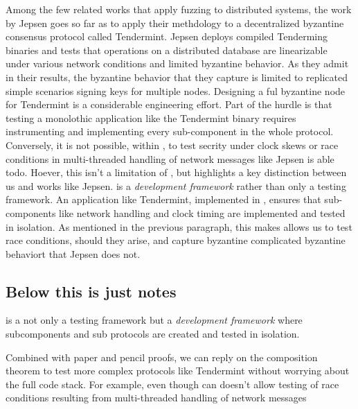 Among the few related works that apply fuzzing to distributed systems, the work by Jepsen goes so far as to apply their methdology to a decentralized byzantine consensus protocol called Tendermint.
Jepsen deploys compiled Tenderming binaries and tests that operations on a distributed database are linearizable under various network conditions and limited byzantine behavior. 
As they admit in their results, the byzantine behavior that they capture is limited to replicated simple scenarios signing keys for multiple nodes. Designing a ful byzantine node for Tendermint is a considerable engineering effort.
Part of the hurdle is that testing a monolothic application like the Tendermint binary requires instrumenting and implementing every sub-component in the whole protocol.
Conversely, it is not possible, within \us, to test secrity under clock skews or race conditions in multi-threaded handling of network messages like Jepsen is able todo.
Hoever, this isn't a limitation of \us, but highlights a key distinction between us and works like Jepsen. \us is a \emph{development framework} rather than only a testing framework.
An application like Tendermint, implemented in \us, ensures that sub-components like network handling and clock timing are implemented and tested in isolation.
As mentioned in the previous paragraph, this makes allows us to test race conditions, should they arise, and capture byzantine complicated byzantine behaviort that Jepsen does not. 

\subsection{Below this is just notes}

\us is a not only a testing framework but a \emph{development framework} where subcomponents and sub protocols are created and tested in isolation.

Combined with paper and pencil proofs, we can reply on the composition theorem to test more complex protocols like Tendermint without worrying about the full code stack.
For example, even though \us can doesn't allow testing of race conditions resulting from multi-threaded handling of network messages 

